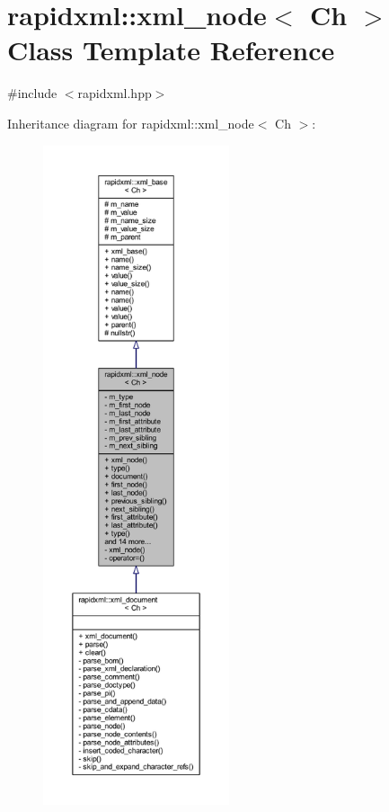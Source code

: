 \hypertarget{singletonrapidxml_1_1xml__node}{\section{rapidxml\+:\+:xml\+\_\+node$<$ Ch $>$ Class Template Reference}
\label{singletonrapidxml_1_1xml__node}
}


{\ttfamily \#include $<$rapidxml.\+hpp$>$}



Inheritance diagram for rapidxml\+:\+:xml\+\_\+node$<$ Ch $>$\+:
\nopagebreak
\begin{figure}[H]
\begin{center}
\leavevmode
\includegraphics[height=550pt]{singletonrapidxml_1_1xml__node__inherit__graph}
\end{center}
\end{figure}


